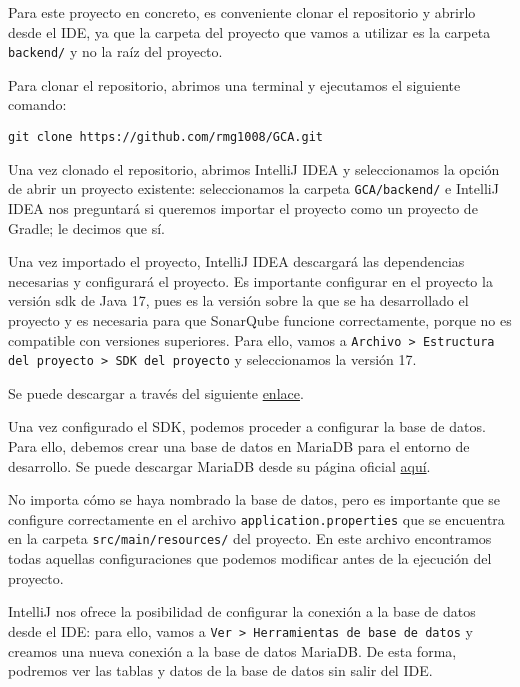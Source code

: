 Para este proyecto en concreto, es conveniente clonar el repositorio y abrirlo desde el IDE, ya que la carpeta del
proyecto que vamos a utilizar es la carpeta \texttt{backend/} y no la raíz del proyecto.

Para clonar el repositorio, abrimos una terminal y ejecutamos el siguiente comando:
\begin{verbatim}
git clone https://github.com/rmg1008/GCA.git
\end{verbatim}

Una vez clonado el repositorio, abrimos IntelliJ IDEA y seleccionamos la opción de abrir un proyecto existente:
seleccionamos la carpeta \texttt{GCA/backend/} e IntelliJ IDEA nos preguntará si queremos importar el proyecto como un
proyecto de Gradle; le decimos que sí.


Una vez importado el proyecto, IntelliJ IDEA descargará las dependencias necesarias y configurará el proyecto.
Es importante configurar en el proyecto la versión sdk de Java 17, pues es la versión sobre la que se ha desarrollado el
proyecto y es necesaria para que SonarQube funcione correctamente, porque no es compatible con versiones superiores.
Para ello, vamos a \texttt{Archivo > Estructura del proyecto > SDK del proyecto} y seleccionamos la versión 17.


Se puede descargar a través del siguiente \href{https://www.azul.com/downloads/?version=java-17-lts&os=windows&package=jdk#zulu}{enlace}.

Una vez configurado el SDK, podemos proceder a configurar la base de datos.
Para ello, debemos crear una base de datos en MariaDB para el entorno de desarrollo.
Se puede descargar MariaDB desde su página oficial \href{https://mariadb.org/download}{aquí}.

No importa cómo se haya nombrado la base de datos, pero es importante que se configure correctamente en el archivo
\texttt{application.properties} que se encuentra en la carpeta \texttt{src/main/resources/} del proyecto.
En este archivo encontramos todas aquellas configuraciones que podemos modificar antes de la ejecución del proyecto.

IntelliJ nos ofrece la posibilidad de configurar la conexión a la base de datos desde el IDE: para ello, vamos a
\texttt{Ver > Herramientas de base de datos} y creamos una nueva conexión a la base de datos MariaDB. De esta forma,
podremos ver las tablas y datos de la base de datos sin salir del IDE.

